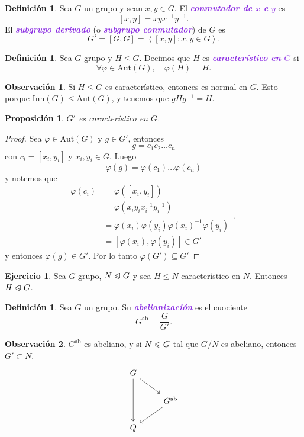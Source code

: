 \documentclass{article}
\newtheorem{proposition}[theorem]{Proposición}
\theoremstyle{definition}
\newtheorem{definition}[theorem]{Definición}
\newtheorem{exercise}{Ejercicio}
\newtheorem*{obs}{Observación}
\theoremstyle{remark}
\numberwithin{equation}{section}
\newcommand{\vphi}{\varphi}
\newcommand{\normal}{\trianglelefteqslant}
\newcommand{\Aut}{\mathrm{Aut}}
\newcommand{\Inn}{\mathrm{Inn}}
\newcommand{\ab}{\mathrm{ab}}
\newcommand{\gen}[1]{\left\langle #1 \right\rangle}
\newcommand{\wea}[1]{\textcolor{BlueViolet}{\textbf{\emph{#1}}}}
\begin{document}
\begin{definition}
  Sea $G$ un grupo y sean $x,y \in G$. El \wea{conmutador de $x$ e $y$} es
  \[[x,y] = xyx^{-1}y^{-1}.\]
  El \wea{subgrupo derivado} (o \wea{subgrupo conmutador}) de $G$ es
  \[G' = [G,G] = \gen{[x,y] : x,y \in G}.\]
\end{definition}

\begin{definition}
  Sea $G$ grupo y $H \leqslant G$. Decimos que $H$ es \wea{característico en $G$} si $$\forall \vphi \in \Aut(G), \quad \vphi(H) = H.$$
\end{definition}

\begin{obs}
  Si $H \leqslant G$ es característico, entonces es normal en $G$. Esto porque $\Inn(G) \leqslant \Aut(G)$, y tenemos que $gHg^{-1} = H$.
\end{obs}

\begin{proposition}
  $G'$ es característico en $G$.
\end{proposition}
\begin{proof}
  Sea $\vphi \in \Aut(G)$ y $g \in G'$, entonces $$g = c_1 c_2 \dots c_n$$ con $c_i = [x_i,y_i]$ y $x_i,y_i \in G$. Luego
  \[\vphi(g) = \vphi(c_1) \dots \vphi(c_n)\]
  y notemos que
  \begin{align*}
    \vphi(c_i) &= \vphi([x_i,y_i]) \\
    &= \vphi(x_i y_i x_i^{-1} y_i^{-1}) \\
    &= \vphi(x_i) \vphi(y_i) \vphi(x_i)^{-1} \vphi(y_i)^{-1} \\
    &= [\vphi(x_i), \vphi(y_i)] \in G'
  \end{align*}
  y entonces $\vphi(g) \in G'$. Por lo tanto $\vphi(G') \subseteq G'$
\end{proof}

\begin{exercise}
  Sea $G$ grupo, $N \normal G$ y sea $H \leqslant N$ característico en $N$. Entonces $H \normal G$.
\end{exercise}

\begin{definition}
  Sea $G$ un grupo. Su \wea{abelianización} es el cuociente
  \[G^\ab = \frac{G}{G'}.\]
\end{definition}

\begin{obs}
  $G^\ab$ es abeliano, y si $N \normal G$ tal que $G/N$ es abeliano, entonces $G' \subset N$.
  \[\begin{tikzcd}
    G & \\
    & {G^\ab} \\
    Q
    \arrow[from=1-1, to=2-2]
    \arrow[from=1-1, to=3-1]
    \arrow[from=2-2, to=3-1]
  \end{tikzcd}\]
\end{obs}
\end{document}
